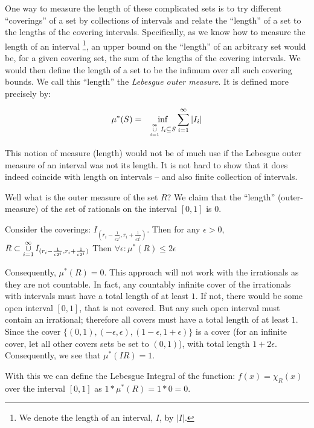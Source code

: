 \documentclass{article}
\begin{document}
One way to measure the length of these complicated sets is to try different ``coverings'' 
of a set by collections of intervals and relate the ``length'' of a set to the lengths of
the covering intervals. Specifically, as
we know how to measure the length of an interval%
\footnote{We denote the length of an interval, $I$, by $|I|$.}, an upper bound on 
the ``length'' of an arbitrary set would be, for a given covering set, 
the sum of the lengths of the covering intervals.
We would then define the length of a set to be the infimum over all such covering bounds.
We call this ``length'' the {\em Lebesgue outer measure\/}. It is defined more precisely by:

\begin{eqnarray}
	\mu^*(S) & = & \inf_{\mathop{\cup}_{i=1}^\infty\limits I_i \subseteq S} \sum_{i=1}^\infty |I_i| 
\end{eqnarray}

This notion of measure (length) would not be of much use if the Lebesgue outer measure of
an interval was not its length.
It is not hard to show that it does indeed coincide with length on 
intervals -- and also finite collection of intervals.

Well what is the outer measure of the set $R$? We claim that the ``length'' 
(outer-measure) of the set of rationals on the interval $[0,1]$ is $0$.

Consider the coverings: $I_{(r_i - \frac{1}{\epsilon 2^i}, r_i + \frac{1}{\epsilon 2^i})}$. 
Then for any
$\epsilon > 0$, $R \subset \mathop{\cup}_{i=1}^\infty\limits I_{(r_i - \frac{1}{\epsilon 2^i}, r_i + \frac{1}{\epsilon 2^i})}$
Then $\forall \epsilon: \mu^*(R) \le 2 \epsilon$

Consequently, $\mu^*(R) = 0$. This approach will not work with the irrationals 
as they are not countable. In fact, any countably infinite cover of the 
irrationals with intervals must have a total length of at least $1$. 
If not, there would be some open interval  $[0,1]$, that is not covered. 
But any such open 
interval must contain an irrational; therefore all covers must have a total length 
of at least $1$. Since the cover $\{(0,1), (-\epsilon, \epsilon), (1 - \epsilon,1 + \epsilon)\}$
is a cover (for an infinite cover, let all other covers sets be set 
to $(0,1)$), with total length $1 + 2 \epsilon$.
Consequently, we see that $\mu^*(IR) = 1$.

With this we can define the Lebesgue Integral of the function: 
$f(x) = \chi_{R}(x)$ over the interval $[0,1]$ 
as $1 * \mu^*(R) = 1 * 0 = 0$.
\end{document}
